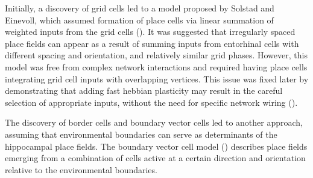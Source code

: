 Initially, a discovery of grid cells led to a model proposed by Solstad and Einevoll, which assumed formation of place cells via linear summation of weighted inputs from the grid cells (\cite{Solstad2006}). It was suggested that irregularly spaced place fields can appear as a result of summing inputs from entorhinal cells with different spacing and orientation, and relatively similar grid phases. However, this model was free from complex network interactions and required having place cells integrating grid cell inputs with overlapping vertices. This issue was fixed later by demonstrating that adding fast hebbian plasticity may result in the careful selection of appropriate inputs, without the need for specific network wiring (\cite{Savelli2010}).

The discovery of border cells and boundary vector cells led to another approach, assuming that environmental boundaries can serve as determinants of the hippocampal place fields. The boundary vector cell model (\cite{Barry2006}) describes place fields emerging from a combination of cells active at a certain direction and orientation relative to the environmental boundaries.


